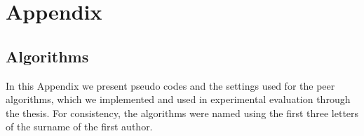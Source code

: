 \renewcommand{\thesection}{\alph{section}}

{}
	
\chapter*{Appendix}
\label{cha:appendix}


\renewcommand{\thefigure}{A.\arabic{figure}}   
\setcounter{figure}{0}
\renewcommand{\thetable}{A.\arabic{table}}
\setcounter{table}{0}

\section{Algorithms}

In this Appendix we present pseudo codes and the settings used for the peer algorithms, which we implemented and used in experimental evaluation through the thesis. For consistency, the algorithms were named using the first three letters of the surname of the first author.

